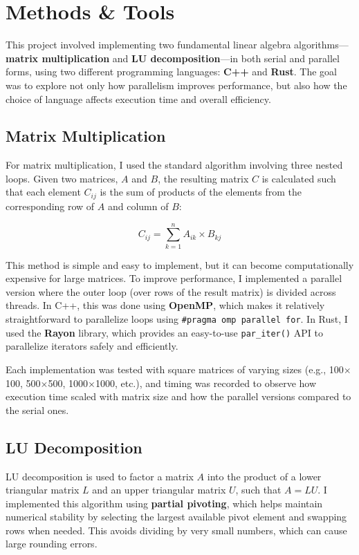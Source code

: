 \documentclass[12pt]{article}
\begin{document}
\section{Methods \& Tools}

This project involved implementing two fundamental linear algebra algorithms---\textbf{matrix multiplication} and \textbf{LU decomposition}---in both
serial and parallel forms, using two different programming languages: \textbf{C++} and \textbf{Rust}. The goal was to explore not only how parallelism
improves performance, but also how the choice of language affects execution time and overall efficiency.

\subsection*{Matrix Multiplication}

For matrix multiplication, I used the standard algorithm involving three nested loops. Given two matrices, \( A \) and \( B \), the resulting matrix
\( C \) is calculated such that each element \( C_{ij} \) is the sum of products of the elements from the corresponding row of \( A \) and column of
\( B \):

\[
    C_{ij} = \sum_{k=1}^{n} A_{ik} \times B_{kj}
\]

This method is simple and easy to implement, but it can become computationally expensive for large matrices. To improve performance, I implemented a
parallel version where the outer loop (over rows of the result matrix) is divided across threads. In C++, this was done using \textbf{OpenMP}, which
makes it relatively straightforward to parallelize loops using \texttt{\#pragma omp parallel for}. In Rust, I used the \textbf{Rayon} library, which
provides an easy-to-use \texttt{par\_iter()} API to parallelize iterators safely and efficiently.

Each implementation was tested with square matrices of varying sizes (e.g., 100$\times$100, 500$\times$500, 1000$\times$1000, etc.), and timing was
recorded to observe how execution time scaled with matrix size and how the parallel versions compared to the serial ones.

\subsection*{LU Decomposition}

LU decomposition is used to factor a matrix \( A \) into the product of a lower triangular matrix \( L \) and an upper triangular matrix \( U \), such
that \( A = LU \). I implemented this algorithm using \textbf{partial pivoting}, which helps maintain numerical stability by selecting the largest available
pivot element and swapping rows when needed. This avoids dividing by very small numbers, which can cause large rounding errors.
\end{document}
